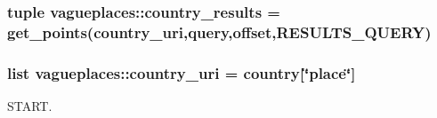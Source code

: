 \hypertarget{namespacevagueplaces_a05416e0b132e478c479ed1fba77ad4a8}{
\subsubsection[{country\-\_\-results}]{\setlength{\rightskip}{0pt plus 5cm}tuple {\bf vagueplaces\-::country\-\_\-results} = {\bf get\-\_\-points}({\bf country\-\_\-uri},{\bf query},{\bf offset},{\bf \-R\-E\-S\-U\-L\-T\-S\-\_\-\-Q\-U\-E\-R\-Y})}}\label{namespacevagueplaces_a05416e0b132e478c479ed1fba77ad4a8}
\hypertarget{namespacevagueplaces_aed19f140324bfa70b0d22d5078ed1a33}{
\subsubsection[{country\-\_\-uri}]{\setlength{\rightskip}{0pt plus 5cm}list {\bf vagueplaces\-::country\-\_\-uri} = {\bf country}\mbox{[}\char`\"{}place\char`\"{}\mbox{]}}}\label{namespacevagueplaces_aed19f140324bfa70b0d22d5078ed1a33}


\-S\-T\-A\-R\-T. 

